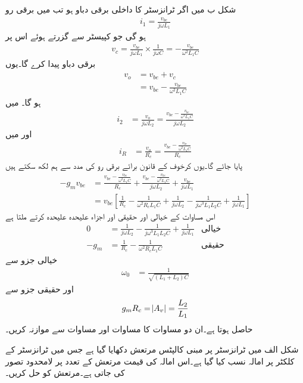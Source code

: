 شکل  ب میں اگر ٹرانزسٹر کا داخلی برقی دباو  ہو تب  میں برقی رو
\begin{align*}
i_1=\frac{v_{be}}{j \omega L_1}
\end{align*}
ہو گی جو کپیسٹر  سے گزرتے ہوئے اس پر
\begin{align*}
v_c =\frac{v_{be}}{j \omega L_1} \times \frac{1}{j \omega C}=-\frac{v_{be}}{\omega^2 L_1 C}
\end{align*}
برقی دباو پیدا کرے گا۔یوں
\begin{align*}
v_o&=v_{be}+v_c\\
&=v_{be}-\frac{v_{be}}{\omega^2 L_1 C}
\end{align*}
ہو گا۔ میں
\begin{align*}
i_2&=\frac{v_o}{j \omega L_2}=\frac{v_{be}-\frac{v_{be}}{\omega^2 L_1 C}}{j \omega L_2}
\end{align*}
اور  میں
\begin{align*}
i_R&=\frac{v_o}{R_c}=\frac{v_{be}-\frac{v_{be}}{\omega^2 L_1 C}}{R_c}
\end{align*}
پایا جائے گا۔یوں کرخوف کے قانون برائے برقی رو کی مدد سے ہم لکھ سکتے ہیں
\begin{align*}
-g_m v_{be}&=\frac{v_{be}-\frac{v_{be}}{\omega^2 L_1 C}}{R_c}+\frac{v_{be}-\frac{v_{be}}{\omega^2 L_1 C}}{j \omega L_2}+\frac{v_{be}}{j \omega L_1}\\
&=v_{be} \left[\frac{1}{R_c}-\frac{1}{\omega^2 R_c L_1 C} +\frac{1}{j \omega L_2}-\frac{1}{j \omega^3 L_1 L_2 C} +\frac{1}{j \omega L_1}\right]
\end{align*}
اس مساوات کے خیالی اور حقیقی اور اجزاء علیحدہ علیحدہ کرتے ملتا ہے
\begin{align*}
0&=\frac{1}{j \omega L_2}-\frac{1}{j \omega^3 L_1 L_2 C}+\frac{1}{j \omega L_1} & \textrm{خیالی}\\
-g_m&=\frac{1}{R_c}-\frac{1}{\omega^2 R_c L_1 C} & \textrm{حقیقی}
\end{align*}
خیالی جزو سے
\begin{align}
\omega_0&=\frac{1}{\sqrt{\left(L_1+L_2 \right) C}}
\end{align}
اور حقیقی جزو سے
\begin{align}
g_m R_c=\abs{A_v}=\frac{L_2}{L_1}
\end{align}
حاصل ہوتا ہے۔ان دو مساوات کا مساوات   اور مساوات  سے موازنہ کریں۔

شکل  الف میں ٹرانزسٹر پر مبنی کالپٹس مرتعش دکھایا گیا ہے جس میں ٹرانزسٹر کے کلکٹر پر امالہ  نسب کیا گیا ہے۔اس امالہ کی قیمت مرتعش کے تعدد پر لامحدود تصور کی جاتی ہے۔مرتعش کو حل کریں۔

